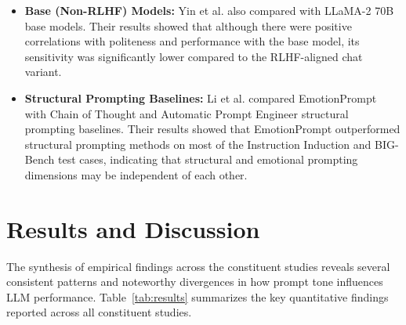 \documentclass[conference]{IEEEtran}
\begin{document}
\begin{itemize}
\item \textbf{Base (Non-RLHF) Models:} Yin et al. \cite{b6} also compared with LLaMA-2 70B base models. Their results showed that although there were positive correlations with politeness and performance with the base model, its sensitivity was significantly lower compared to the RLHF-aligned chat variant.
\item \textbf{Structural Prompting Baselines:} Li et al. \cite{b9} compared EmotionPrompt with Chain of Thought and Automatic Prompt Engineer structural prompting baselines. Their results showed that EmotionPrompt outperformed structural prompting methods on most of the Instruction Induction and BIG-Bench test cases, indicating that structural and emotional prompting dimensions may be independent of each other.
\end{itemize}

\section{Results and Discussion}

The synthesis of empirical findings across the constituent studies reveals several consistent patterns and noteworthy divergences in how prompt tone influences LLM performance. Table~\ref{tab:results} summarizes the key quantitative findings reported across all constituent studies.

\begin{table}[htbp]
\caption{Key Quantitative Tone Sensitivity Findings Across Studies}
\label{tab:results}
\centering
{}
\end{table}
\end{document}
